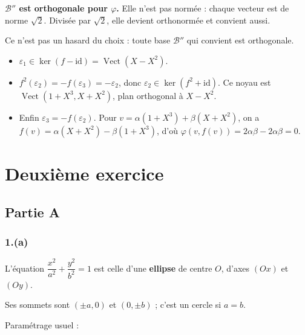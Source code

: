 \documentclass[11pt,a4paper]{article}
\providecommand{\tightlist}{\setlength{\itemsep}{0pt}\setlength{\parskip}{0pt}}
\newcommand{\equationajustee}[1]{%
  \sbox{\boiteequation}{$\displaystyle #1$}%
  \ifdim\wd\boiteequation>\linewidth
    \[\resizebox{\linewidth}{!}{\usebox{\boiteequation}}\]%
  \else
    \[#1\]%
  \fi}
\begin{document}
\equationajustee{\begin{aligned}
\varphi(\varepsilon_1,\varepsilon_2)&=0,\\
\varphi(\varepsilon_2,\varepsilon_3)&=0,\\
\varphi(\varepsilon_1,\varepsilon_3)&=-1+1=0.
\end{aligned}}

\textbf{\(\mathcal{B}''\) est orthogonale pour \(\varphi\).} Elle n'est pas normée : chaque vecteur est de norme \(\sqrt2\). Divisée par \(\sqrt2\), elle devient orthonormée et convient aussi.

Ce n'est pas un hasard du choix : toute base \(\mathcal{B}''\) qui convient est orthogonale.

\begin{itemize}
\tightlist
\item
  \(\varepsilon_1\in\ker(f-\mathrm{id})=\operatorname{Vect}(X-X^2)\).
\item
  \(f^2(\varepsilon_2)=-f(\varepsilon_3)=-\varepsilon_2\), donc \(\varepsilon_2\in\ker(f^2+\mathrm{id})\). Ce noyau est \(\operatorname{Vect}(1+X^3,X+X^2)\), plan orthogonal à \(X-X^2\).
\item
  Enfin \(\varepsilon_3=-f(\varepsilon_2)\). Pour \(v=\alpha(1+X^3)+\beta(X+X^2)\), on a \(f(v)=\alpha(X+X^2)-\beta(1+X^3)\), d'où \(\varphi(v,f(v))=2\alpha\beta-2\alpha\beta=0\).
\end{itemize}

\hypertarget{deuxiuxe8me-exercice}{%
\section{Deuxième exercice}\label{deuxiuxe8me-exercice}}

\hypertarget{partie-a-1}{%
\subsection{Partie A}\label{partie-a-1}}

\hypertarget{a-1}{%
\subsubsection{1.(a)}\label{a-1}}

L'équation \(\dfrac{x^2}{a^2}+\dfrac{y^2}{b^2}=1\) est celle d'une \textbf{ellipse} de centre \(O\), d'axes \((Ox)\) et \((Oy)\).

Ses sommets sont \((\pm a,0)\) et \((0,\pm b)\) ; c'est un cercle si \(a=b\).

Paramétrage usuel :
\end{document}
